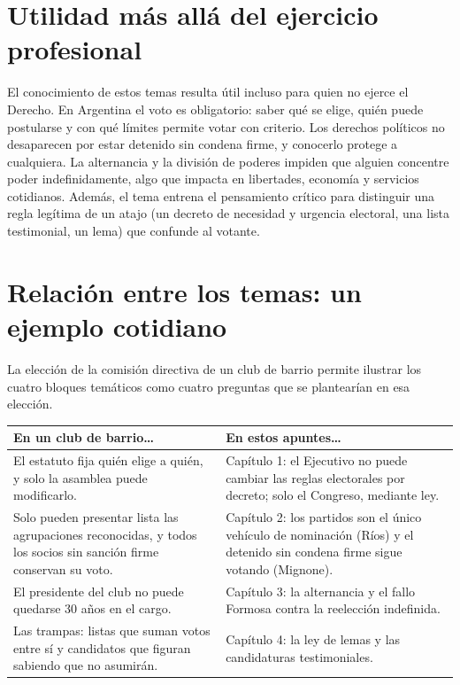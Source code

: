 \documentclass[12pt,oneside]{book}
\begin{document}
\section*{Utilidad más allá del ejercicio profesional}

El conocimiento de estos temas resulta útil incluso para quien no ejerce el Derecho. En Argentina el voto es obligatorio: saber qué se elige, quién puede postularse y con qué límites permite votar con criterio. Los derechos políticos no desaparecen por estar detenido sin condena firme, y conocerlo protege a cualquiera. La alternancia y la división de poderes impiden que alguien concentre poder indefinidamente, algo que impacta en libertades, economía y servicios cotidianos. Además, el tema entrena el pensamiento crítico para distinguir una regla legítima de un atajo (un decreto de necesidad y urgencia electoral, una lista testimonial, un lema) que confunde al votante.

\section*{Relación entre los temas: un ejemplo cotidiano}

La elección de la comisión directiva de un club de barrio permite ilustrar los cuatro bloques temáticos como cuatro preguntas que se plantearían en esa elección.

\begin{table}[H]
\centering
\begin{tabularx}{\textwidth}{>{\raggedright\arraybackslash}X >{\raggedright\arraybackslash}X}
\toprule
\textbf{En un club de barrio\ldots} & \textbf{En estos apuntes\ldots} \\
\midrule
El estatuto fija quién elige a quién, y solo la asamblea puede modificarlo. &
Capítulo 1: el Ejecutivo no puede cambiar las reglas electorales por decreto; solo el Congreso, mediante ley. \\
\addlinespace
Solo pueden presentar lista las agrupaciones reconocidas, y todos los socios sin sanción firme conservan su voto. &
Capítulo 2: los partidos son el único vehículo de nominación (Ríos) y el detenido sin condena firme sigue votando (Mignone). \\
\addlinespace
El presidente del club no puede quedarse 30 años en el cargo. &
Capítulo 3: la alternancia y el fallo Formosa contra la reelección indefinida. \\
\addlinespace
Las trampas: listas que suman votos entre sí y candidatos que figuran sabiendo que no asumirán. &
Capítulo 4: la ley de lemas y las candidaturas testimoniales. \\
\bottomrule
\end{tabularx}
\end{table}
\end{document}
